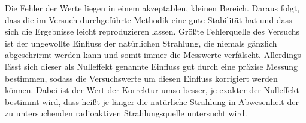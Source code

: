 \documentclass[
  bibliography=totoc,     %
  captions=tableheading,  %
  titlepage=firstiscover, %
]{scrartcl}
\begin{document}
Die Fehler der Werte liegen in einem akzeptablen, kleinen Bereich. Daraus folgt,
dass die im Versuch durchgeführte Methodik eine gute Stabilität hat und dass
sich die Ergebnisse leicht reproduzieren lassen. Größte Fehlerquelle des
Versuchs ist der ungewollte Einfluss der natürlichen Strahlung, die niemals
gänzlich abgeschrirmt werden kann und somit immer die Messwerte verfälscht.
Allerdings lässt sich dieser als Nulleffekt genannte Einfluss gut durch eine
präzise Messung bestimmen, sodass die Versuchswerte um diesen Einfluss
korrigiert werden können. Dabei ist der Wert der Korrektur umso besser, je
exakter der Nulleffekt bestimmt wird, dass heißt je länger die natürliche
Strahlung in Abwesenheit der zu untersuchenden radioaktiven Strahlungsquelle
untersucht wird.
\end{document}
